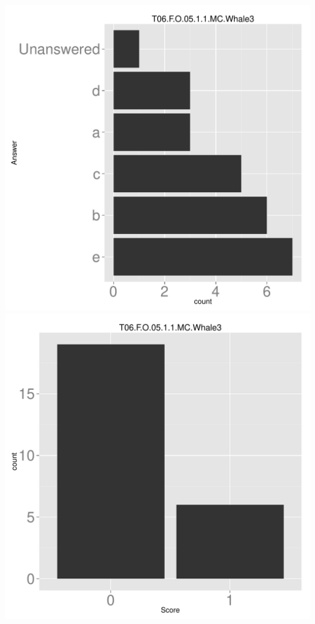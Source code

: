 \documentclass[12pt,nohyper]{tufte-handout}\usepackage[]{graphicx}\usepackage[]{color}
\begin{document}
\begin{center} \includegraphics[width=.45\linewidth]{Topic06_58_answer} \includegraphics[width=.45\linewidth]{Topic06_58_score} \end{center} 
\end{document}

